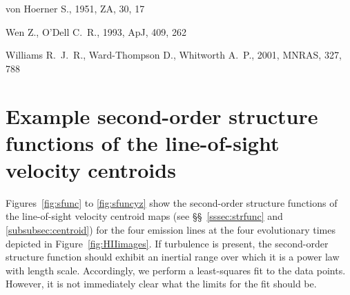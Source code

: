 \documentclass[useAMS,usenatbib]{mn2e}
\begin{document}
\begin{thebibliography}{}
von Hoerner S., 1951, ZA, 30, 17 

 Wen Z., O'Dell C.~R., 1993, ApJ, 409, 262 

 Williams R.~J.~R., Ward-Thompson D., Whitworth A.~P., 2001, MNRAS, 327, 788 








\end{thebibliography}

\appendix

\section[]{Example second-order structure functions of the line-of-sight velocity centroids}
\label{app:sf}
Figures~\ref{fig:sfunc} to \ref{fig:sfuncyz} show the second-order
structure functions of the line-of-sight velocity centroid maps (see
\S\S~\ref{sssec:strfunc} and \ref{subsubsec:centroid}) for the four
emission lines at the four evolutionary times depicted in
Figure~\ref{fig:HIIimages}.  If turbulence is present, the
second-order structure function should exhibit an inertial range over
which it is a power law with length scale. Accordingly, we perform a
least-squares fit to the data points. However, it is not immediately
clear what the limits for the fit should be. 
\end{document}
